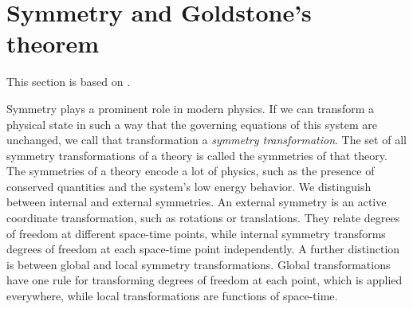 \section{Symmetry and Goldstone's theorem}
\label{section:symmetry}

This section is based on \cite{weinberg_1995,weinberg_1996_vol2,Peskin:IntroQFT,smooth_manifolds}.

Symmetry plays a prominent role in modern physics.
If we can transform a physical state in such a way that the governing equations of this system are unchanged, we call that transformation a \emph{symmetry transformation}.
The set of all symmetry transformations of a theory is called the symmetries of that theory.
The symmetries of a theory encode a lot of physics, such as the presence of conserved quantities and the system's low energy behavior.
We distinguish between internal and external symmetries.
An external symmetry is an active coordinate transformation, such as rotations or translations.
They relate degrees of freedom at different space-time points, while internal symmetry transforms degrees of freedom at each space-time point independently.
A further distinction is between global and local symmetry transformations.
Global transformations have one rule for transforming degrees of freedom at each point, which is applied everywhere, while local transformations are functions of space-time.

